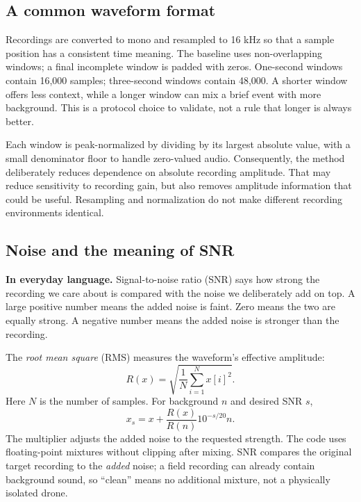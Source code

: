 \documentclass[11pt,letterpaper]{article}
\newcommand{\plain}[1]{\par\smallskip\noindent\textbf{In everyday language.} #1\par\smallskip}
\begin{document}
\subsection{A common waveform format}
Recordings are converted to mono and resampled to 16 kHz so that a sample
position has a consistent time meaning. The baseline uses non-overlapping
windows; a final incomplete window is padded with zeros. One-second windows
contain 16,000 samples; three-second windows contain 48,000. A shorter window
offers less context, while a longer window can mix a brief event with more
background. This is a protocol choice to validate, not a rule that longer is
always better.

Each window is peak-normalized by dividing by its largest absolute value,
with a small denominator floor to handle zero-valued audio. Consequently, the
method deliberately reduces dependence on absolute recording amplitude.
That may reduce sensitivity to recording gain, but also removes amplitude
information that could be useful. Resampling and normalization do not make
different recording environments identical.

\subsection{Noise and the meaning of SNR}
\plain{Signal-to-noise ratio (SNR) says how strong the recording we care about
is compared with the noise we deliberately add on top. A large positive number
means the added noise is faint. Zero means the two are equally strong. A
negative number means the added noise is stronger than the recording.}

The \emph{root mean square} (RMS) measures the waveform's effective amplitude:
\begin{equation}
 R(x)=\sqrt{\frac{1}{N}\sum_{i=1}^{N}x[i]^2}.
\end{equation}
Here $N$ is the number of samples. For background $n$ and desired SNR $s$,
\begin{equation}
 x_s=x+\frac{R(x)}{R(n)}10^{-s/20}n.
 \label{eq:noise}
\end{equation}
The multiplier adjusts the added noise to the requested strength. The code
uses floating-point mixtures without clipping after mixing. SNR compares the
original target recording to the \emph{added} noise; a field recording can
already contain background sound, so ``clean'' means no additional mixture,
not a physically isolated drone.
\end{document}
